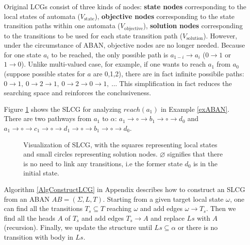 \begin{remark}
Original LCGs consist of three kinds of nodes: \textbf{state nodes} corresponding to the local states of automata {\rm($V_{\mathrm{state}}$)}, \textbf{objective nodes} corresponding to the state transition paths within one automata {\rm($V_{\mathrm{objective}}$)}, \textbf{solution nodes} corresponding to the transitions to be used for each state transition path {\rm($V_{\mathrm{solution}}$)}.
However, under the circumstance of ABAN, objective nodes are no longer needed.
Because for one state $a_i$ to be reached, the only possible path is $a_{1-i}\to a_i$ ($0\to1 $ or $1\to 0$).
Unlike multi-valued case, for example, if one wants to reach $a_1$ from $a_0$ (suppose possible states for $a$ are 0,1,2), there are in fact infinite possibile paths: $0\to 1,\ 0\to 2 \to 1,\ 0 \to 2 \to 0 \to 1,\ \ldots$
This simplification in fact reduces the searching space and reinforces the conclusiveness.
\end{remark}

\begin{example}
    Figure \ref{LCGexample} shows the SLCG for analyzing $reach(a_1)$ in Example \ref{exABAN}.
    There are two pathways from $a_1$ to $\alpha$: $a_1\to \circ\to b_1\to \circ\to d_0$ and $a_1\to \circ\to c_1\to \circ\to d_1\to \circ\to b_1\to \circ \to d_0$.
    \begin{figure}[ht]
        \centering
        
        \caption[SLCG]{Visualization of SLCG, with the squares representing local states and small circles representing solution nodes.
        $\varnothing$ signifies that there is no need to link any transitions, i.e the former state $d_0$ is in the initial state.}
        \label{LCGexample}
    \end{figure}
\end{example}

Algorithm \ref{AlgConstructLCG} in Appendix describes how to construct an SLCG from an ABAN $AB = (\Sigma,L,T)$.
Starting from  a given target local state $\omega$, one can find all the transitions $T_s\subseteq T$ reaching $\omega$ and add edges $\omega \to T_s$.
Then we find all the heads $A$ of $T_s$ and add edges $T_s \to A$ and replace $Ls$ with $A$ (recursion).
Finally, we update the structure until $Ls\subseteq \alpha$ or there is no transition with body in $Ls$.

